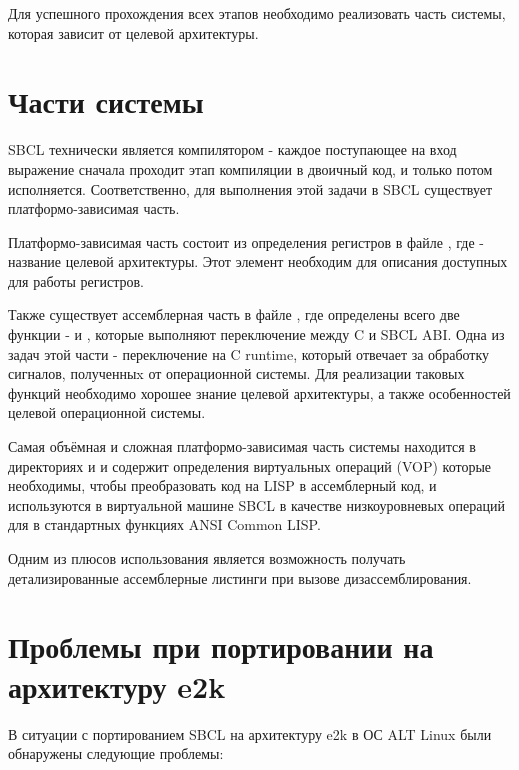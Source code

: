 Для успешного прохождения всех этапов необходимо реализовать часть
системы, которая зависит от целевой архитектуры.


\section{Части системы}

SBCL технически является компилятором - каждое поступающее на вход
выражение сначала проходит этап компиляции в двоичный код, и только потом
исполняется. Соответственно, для выполнения этой задачи в SBCL
существует платформо-зависимая часть.

Платформо-зависимая часть состоит из определения регистров в файле
 , где  -
название целевой архитектуры. Этот элемент необходим для описания
доступных для работы регистров.

Также существует ассемблерная часть в файле
, где определены всего две функции -
 и , которые выполняют переключение
между C и SBCL ABI. Одна из задач этой части - переключение на
C runtime, который отвечает за обработку сигналов, полученныx от
операционной системы. Для реализации таковых функций необходимо хорошее
знание  целевой архитектуры, а также особенностей
целевой операционной системы.

Самая объёмная и сложная платформо-зависимая часть системы находится в
директориях  и 
и содержит определения виртуальных операций (VOP) которые необходимы,
чтобы преобразовать код на LISP в ассемблерный код, и используются в
виртуальной машине SBCL в качестве низкоуровневых операций для
в стандартных функциях ANSI Common LISP.

Одним из плюсов использования  является
возможность получать детализированные ассемблерные листинги при вызове
дизассемблирования.


\section{Проблемы при портировании на архитектуру e2k}

В ситуации с портированием SBCL на архитектуру e2k в ОС ALT Linux были
обнаружены следующие проблемы:


